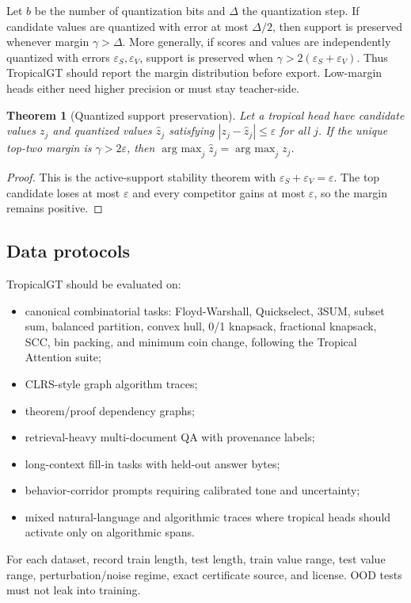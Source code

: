 \documentclass[11pt]{article}
\newtheorem{theorem}[definition]{Theorem}
\newcommand{\argmax}{\operatorname*{arg\ max}}
\newcommand{\eps}{\varepsilon}
\begin{document}
Let \(b\) be the number of quantization bits and \(\Delta\) the quantization step.  If candidate values are quantized with error at most \(\Delta/2\), then support is preserved whenever margin \(\gamma>\Delta\).  More generally, if scores and values are independently quantized with errors \(\eps_S,\eps_V\), support is preserved when \(\gamma>2(\eps_S+\eps_V)\).  Thus TropicalGT should report the margin distribution before export.  Low-margin heads either need higher precision or must stay teacher-side.

\begin{theorem}[Quantized support preservation]
Let a tropical head have candidate values \(z_j\) and quantized values \(\hat z_j\) satisfying \(|z_j-\hat z_j|\le\eps\) for all \(j\).  If the unique top-two margin is \(\gamma>2\eps\), then \(\argmax_j \hat z_j=\argmax_j z_j\).
\end{theorem}
\begin{proof}
This is the active-support stability theorem with \(\eps_S+\eps_V=\eps\).  The top candidate loses at most \(\eps\) and every competitor gains at most \(\eps\), so the margin remains positive.
\end{proof}

\subsection{Data protocols}

TropicalGT should be evaluated on:
\begin{itemize}
\item canonical combinatorial tasks: Floyd-Warshall, Quickselect, 3SUM, subset sum, balanced partition, convex hull, 0/1 knapsack, fractional knapsack, SCC, bin packing, and minimum coin change, following the Tropical Attention suite;
\item CLRS-style graph algorithm traces;
\item theorem/proof dependency graphs;
\item retrieval-heavy multi-document QA with provenance labels;
\item long-context fill-in tasks with held-out answer bytes;
\item behavior-corridor prompts requiring calibrated tone and uncertainty;
\item mixed natural-language and algorithmic traces where tropical heads should activate only on algorithmic spans.
\end{itemize}

For each dataset, record train length, test length, train value range, test value range, perturbation/noise regime, exact certificate source, and license.  OOD tests must not leak into training.
\end{document}
